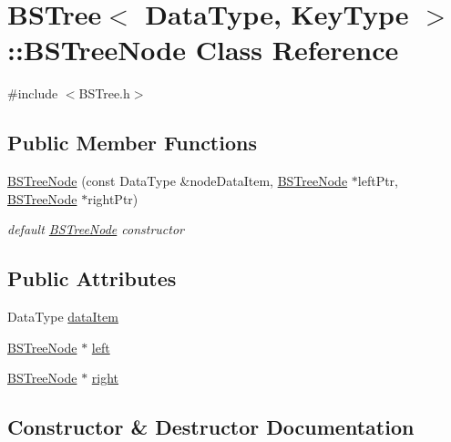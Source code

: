 \hypertarget{class_b_s_tree_1_1_b_s_tree_node}{}\section{B\+S\+Tree$<$ Data\+Type, Key\+Type $>$\+:\+:B\+S\+Tree\+Node Class Reference}
\label{class_b_s_tree_1_1_b_s_tree_node}


{\ttfamily \#include $<$B\+S\+Tree.\+h$>$}

\subsection*{Public Member Functions}
\begin{DoxyCompactItemize}
\item 
\hyperlink{class_b_s_tree_1_1_b_s_tree_node_a40f0e1ccea243f6d47b5c1b0a2913ff8}{B\+S\+Tree\+Node} (const Data\+Type \&node\+Data\+Item, \hyperlink{class_b_s_tree_1_1_b_s_tree_node}{B\+S\+Tree\+Node} $\ast$left\+Ptr, \hyperlink{class_b_s_tree_1_1_b_s_tree_node}{B\+S\+Tree\+Node} $\ast$right\+Ptr)
\begin{DoxyCompactList}\small\item\em default \hyperlink{class_b_s_tree_1_1_b_s_tree_node}{B\+S\+Tree\+Node} constructor \end{DoxyCompactList}\end{DoxyCompactItemize}
\subsection*{Public Attributes}
\begin{DoxyCompactItemize}
\item 
Data\+Type \hyperlink{class_b_s_tree_1_1_b_s_tree_node_a507c8d6dde1b8d35d9af6b4e78f38962}{data\+Item}
\item 
\hyperlink{class_b_s_tree_1_1_b_s_tree_node}{B\+S\+Tree\+Node} $\ast$ \hyperlink{class_b_s_tree_1_1_b_s_tree_node_a7a90150dd249432e240dc363955c5ca1}{left}
\item 
\hyperlink{class_b_s_tree_1_1_b_s_tree_node}{B\+S\+Tree\+Node} $\ast$ \hyperlink{class_b_s_tree_1_1_b_s_tree_node_a8d7bfd0208a562c8b8ab332e1d796563}{right}
\end{DoxyCompactItemize}


\subsection{Constructor \& Destructor Documentation}
